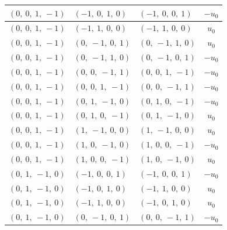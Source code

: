 \documentclass[11pt]{article}
\theoremstyle{definition}
\begin{document}
\begin{longtable}{|l|l|l|c|}
    \hline
    $\left( 0, \  0, \  1, \  -1\right)$ & $\left( -1, \  0, \  1, \  0\right)$ & $\left( -1, \  0, \  0, \  1\right)$ & $- u_{0}$ \\
    \hline
    $\left( 0, \  0, \  1, \  -1\right)$ & $\left( -1, \  1, \  0, \  0\right)$ & $\left( -1, \  1, \  0, \  0\right)$ & $u_{0}$ \\
    \hline
    $\left( 0, \  0, \  1, \  -1\right)$ & $\left( 0, \  -1, \  0, \  1\right)$ & $\left( 0, \  -1, \  1, \  0\right)$ & $u_{0}$ \\
    \hline
    $\left( 0, \  0, \  1, \  -1\right)$ & $\left( 0, \  -1, \  1, \  0\right)$ & $\left( 0, \  -1, \  0, \  1\right)$ & $- u_{0}$ \\
    \hline
    $\left( 0, \  0, \  1, \  -1\right)$ & $\left( 0, \  0, \  -1, \  1\right)$ & $\left( 0, \  0, \  1, \  -1\right)$ & $- u_{0}$ \\
    \hline
    $\left( 0, \  0, \  1, \  -1\right)$ & $\left( 0, \  0, \  1, \  -1\right)$ & $\left( 0, \  0, \  -1, \  1\right)$ & $- u_{0}$ \\
    \hline
    $\left( 0, \  0, \  1, \  -1\right)$ & $\left( 0, \  1, \  -1, \  0\right)$ & $\left( 0, \  1, \  0, \  -1\right)$ & $- u_{0}$ \\
    \hline
    $\left( 0, \  0, \  1, \  -1\right)$ & $\left( 0, \  1, \  0, \  -1\right)$ & $\left( 0, \  1, \  -1, \  0\right)$ & $u_{0}$ \\
    \hline
    $\left( 0, \  0, \  1, \  -1\right)$ & $\left( 1, \  -1, \  0, \  0\right)$ & $\left( 1, \  -1, \  0, \  0\right)$ & $u_{0}$ \\
    \hline
    $\left( 0, \  0, \  1, \  -1\right)$ & $\left( 1, \  0, \  -1, \  0\right)$ & $\left( 1, \  0, \  0, \  -1\right)$ & $- u_{0}$ \\
    \hline
    $\left( 0, \  0, \  1, \  -1\right)$ & $\left( 1, \  0, \  0, \  -1\right)$ & $\left( 1, \  0, \  -1, \  0\right)$ & $u_{0}$ \\
    \hline
    $\left( 0, \  1, \  -1, \  0\right)$ & $\left( -1, \  0, \  0, \  1\right)$ & $\left( -1, \  0, \  0, \  1\right)$ & $- u_{0}$ \\
    \hline
    $\left( 0, \  1, \  -1, \  0\right)$ & $\left( -1, \  0, \  1, \  0\right)$ & $\left( -1, \  1, \  0, \  0\right)$ & $u_{0}$ \\
    \hline
    $\left( 0, \  1, \  -1, \  0\right)$ & $\left( -1, \  1, \  0, \  0\right)$ & $\left( -1, \  0, \  1, \  0\right)$ & $u_{0}$ \\
    \hline
    $\left( 0, \  1, \  -1, \  0\right)$ & $\left( 0, \  -1, \  0, \  1\right)$ & $\left( 0, \  0, \  -1, \  1\right)$ & $- u_{0}$ \\

\end{longtable}
\end{document}
